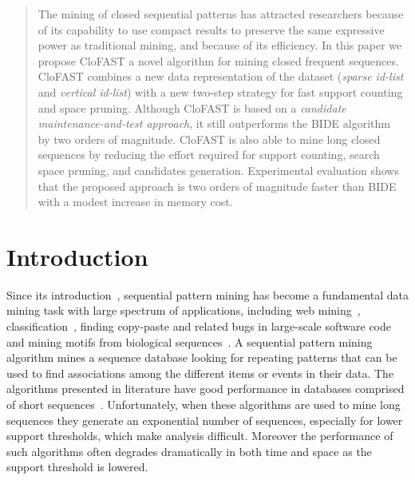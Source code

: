 \documentclass{sig-alternate}
\begin{document}
\maketitle
\begin{abstract}
The mining of closed sequential patterns has attracted researchers because of its capability to use compact results to preserve the same expressive power as traditional mining, and because of its efficiency. In this paper we propose CloFAST a novel algorithm for mining closed frequent sequences. CloFAST combines a new data representation of the dataset (\emph{sparse id-list} and \textit{vertical id-list}) with a new two-step strategy for fast support counting and space pruning. Although CloFAST is based on a \emph{candidate maintenance-and-test approach}, it still outperforms the BIDE algorithm~\cite{Wang:2007} by two orders of magnitude. CloFAST is also able to mine long closed sequences by reducing the effort required for support counting, search space pruning, and candidates generation. Experimental evaluation shows that the proposed approach is two orders of magnitude faster than BIDE with a modest increase in memory cost.
\end{abstract}




\section{Introduction}
Since its introduction~\cite{Agrawal:1995}, sequential pattern mining has become a fundamental data mining task with large spectrum of applications, including web mining~\cite{Zhu:2010}, classification~\cite{Exarchos:2008}, finding copy-paste and related bugs in large-scale software code~\cite{Zhenmin:2006} and mining motifs from biological sequences~\cite{Turi:2009}. A sequential pattern mining algorithm mines a sequence database looking for repeating patterns that can be used to find associations among the different items or events in their data. The algorithms presented in literature have good performance in databases comprised of short sequences~\cite{prefixspan:2001, spade, Ayres:2002, hsvm, lapin}. Unfortunately, when these algorithms are used to mine long sequences they generate an exponential number of sequences, especially for lower support thresholds, which make analysis difficult. Moreover the performance of such algorithms often degrades dramatically in both time and space as the support threshold is lowered.
\end{document}
